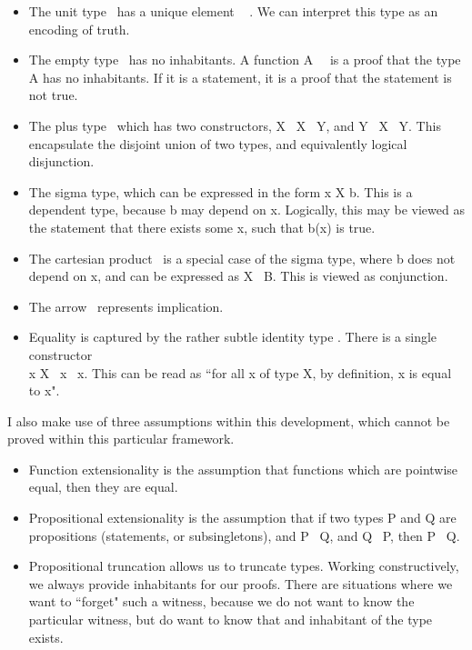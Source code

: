 \documentclass[ProjectReport]{subfiles}
\begin{document}
\begin{itemize}
    \item The unit type \AgdaOne \ has a unique element \AgdaStar \ \AgdaSymbol{:} \AgdaOne. We can interpret this type as an      encoding of truth. 
    \item The empty type \AgdaZero \ has no inhabitants. A function  \AgdaSymbol{:} A \to \ \AgdaZero \ is a proof that the type A has no inhabitants. If it is a statement, it is a proof that the statement is not true.
    \item The plus type \AgdaPlus \ which has two constructors,  \AgdaSymbol{:} X \to \ X \AgdaPlusA \ Y, and  \AgdaSymbol{:} Y \to \ X \AgdaPlusA \ Y. This encapsulate the disjoint union of two types, and equivalently logical disjunction.
    \item The sigma type, which can be expressed in the form \AgdaDatatype{$\Sigma$} x \AgdaSymbol{:} X \AgdaDatatype{,} b. This is a dependent type, because b may depend on x. Logically, this may be viewed as the statement that there exists some x, such that b(x) is true. 
    \item The cartesian product \AgdaTimes \ is a special case of the sigma type, where b does not depend on x, and can be expressed as X \AgdaTimesA \ B. This is viewed as conjunction.
    \item The arrow \to \ represents implication.
    \item Equality is captured by the rather subtle identity type \AgdaEqual. There is a single constructor \\  \AgdaSymbol{:} \AgdaSymbol{(}x \AgdaSymbol{:} X\AgdaSymbol{)} \to \ x \AgdaEqualA \ x. This can be read as ``for all x of type X, by definition, x is equal to x".
\end{itemize}

I also make use of three assumptions within this development, which cannot be proved within this particular framework.

\begin{itemize}
    \item Function extensionality is the assumption that functions which are pointwise equal, then they are equal. 
    \item Propositional extensionality is the assumption that if two types P and Q are propositions (statements, or subsingletons), and P \to \ Q, and Q \to \ P, then P \AgdaEqualA \ Q.
    \item Propositional truncation allows us to truncate types. Working constructively, we always provide inhabitants for our proofs. There are situations where we want to ``forget" such a witness, because we do not want to know the particular witness, but do want to know that and inhabitant of the type exists.

\end{itemize}
\end{document}
